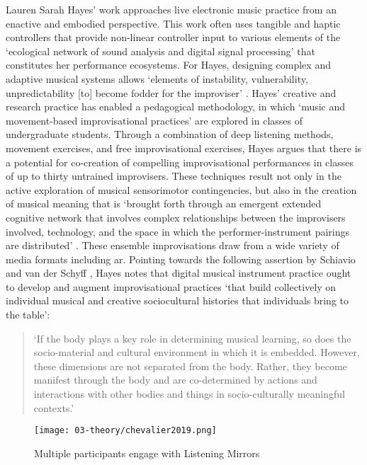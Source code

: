Lauren Sarah Hayes' work approaches live electronic music practice from an enactive and embodied perspective. This work often uses tangible and haptic controllers that provide non-linear controller input to various elements of the `ecological network of sound analysis and digital signal processing' that constitutes her performance ecosystems. For Hayes, designing complex and adaptive musical systems allows `elements of instability, vulnerability, unpredictability [to] become fodder for the improviser' \citep[p. 2]{hayes2018}. Hayes' creative and research practice has enabled a pedagogical methodology, in which `music and movement-based improvisational practices' are explored in classes of undergraduate students. Through a combination of deep listening methods, movement exercises, and free improvisational exercises, Hayes argues that there is a potential for co-creation of compelling improvisational performances in classes of up to thirty untrained improvisers. These techniques result not only in the active exploration of musical sensorimotor contingencies, but also in the creation of musical meaning that is `brought forth through an emergent extended cognitive network that involves complex relationships between the improvisers involved, technology, and the space in which the performer-instrument pairings are distributed' \citep[p. 8]{hayes2019}. These ensemble improvisations draw from a wide variety of media formats including \gls{ar}. Pointing towards the following assertion by Schiavio and van der Schyff \citeyearpar{schiavio2018}, Hayes notes that digital musical instrument practice ought to develop and augment improvisational practices `that build collectively on individual musical and creative sociocultural histories that individuals bring to the table':
\begin{quote}
    `If the body plays a key role in determining musical learning, so does the socio-material and cultural environment in which it is embedded. However, these dimensions are not separated from the body. Rather, they become manifest through the body and are co-determined by actions and interactions with other bodies and things in socio-culturally meaningful contexts.' \citep[p. 9]{hayes2018}
\end{quote}

\begin{wrapfigure}{l}{0.45\textwidth}
    \vspace{-\intextsep}
\begin{minipage}{0.95\linewidth}
    \texttt{[image: 03-theory/chevalier2019.png]}
    \captionsetup{justification=justified}
    \caption{Multiple participants engage with Listening Mirrors \citep[from][]{chevalier2019}}\label{fig: chevalier2019}
\end{minipage}
\hfill
\end{wrapfigure}

